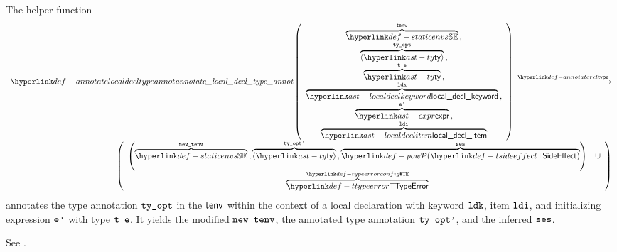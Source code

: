 \hypertarget{def-annotatelocaldecltypeannot}{}
The helper function
\[
\begin{array}{r}
  \annotatelocaldecltypeannot
  \left(
  \begin{array}{c}
    \overname{\staticenvs}{\tenv} \aslsep \\
    \overname{\langle\ty\rangle}{\tyopt} \aslsep \\
    \overname{\ty}{\vte} \aslsep \\
    \overname{\localdeclkeyword}{\ldk} \aslsep \\
    \overname{\expr}{\vep} \aslsep\\
    \overname{\localdeclitem}{\ldi}
  \end{array}
  \right)
  \typearrow \\
  \left(
  \begin{array}{cl}
    \left(\overname{\staticenvs}{\newtenv} \aslsep \overname{\langle\ty\rangle}{\tyoptp} \aslsep \overname{\TSideEffectSet}{\vses}\right)
    & \cup \\
    \overname{\TTypeError}{\TypeErrorConfig} &
  \end{array}
  \right)
\end{array}
\]
annotates the type annotation $\texttt{ty\_opt}$ in the \staticenvironmentterm{} $\textsf{tenv}$ within the context of a local declaration with keyword $\texttt{ldk}$, item $\texttt{ldi}$, and initializing expression $\texttt{e'}$ with type $\texttt{t\_e}$.
It yields the modified \staticenvironmentterm{} $\texttt{new\_tenv}$, the annotated type annotation $\texttt{ty\_opt'}$, and the inferred \sideeffectsetterm{} $\texttt{ses}$.
\ProseOtherwiseTypeError

See .

